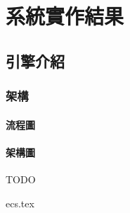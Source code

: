 \chapter{系統實作結果}

\section{引擎介紹}

\subsection{架構}
\label{sub:架構}

\subsubsection{流程圖} %
\label{ssub:流程圖}



\subsubsection{架構圖} %
\label{ssub:架構圖}
TODO


{ecs.tex}


\newpage